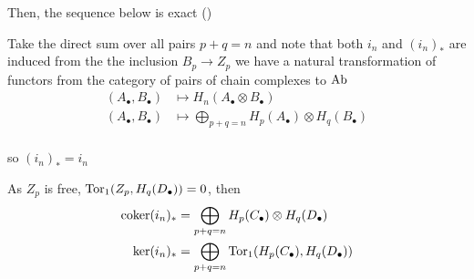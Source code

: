 \begin{longproof}
\begin{enumerate}
		Then, the sequence below is exact ()
		\begin{center}
		\end{center}
		
		Take the direct sum over all pairs $p + q = n$ and note that both $i_n$ and $(i_n)_*$ are induced from the the inclusion $B_p \to Z_p$ we have a natural transformation of functors from the category of pairs of chain complexes to $\operatorname{Ab}$
		\begin{align*}
			(A_\bullet, B_\bullet) &\mapsto H_n(A_\bullet \otimes B_\bullet) \\
			(A_\bullet, B_\bullet) &\mapsto \bigoplus_{p+q=n} H_p(A_\bullet) \otimes H_q(B_\bullet) \\
		\end{align*}
		
		so $(i_n)_* = i_n$
		
		\begin{center}
		\end{center}
		
	\end{enumerate}
	
	As $Z_p$ is free, $\operatorname{Tor}_1(Z_p, H_q(D_\bullet)) = 0$, then 
	\begin{align*}
		\operatorname{coker}(i_n)_* &= \bigoplus_{p+q=n} H_p(C_\bullet) \otimes H_q(D_\bullet) \\
		\ker (i_n)_* &= \bigoplus_{p+q=n} \operatorname{Tor}_1(H_p(C_\bullet), H_q(D_\bullet))
	\end{align*}
	

\end{longproof}
